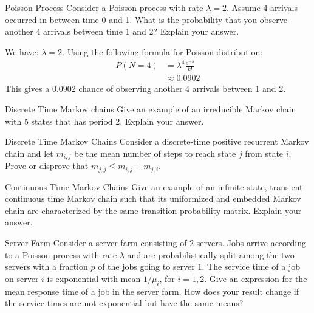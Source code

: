 \begin{problem}{Poisson Process}
 Consider a Poisson process with rate $\lambda =2$. Assume 4 arrivals occurred in between time 0 and 1. What is the probability that you observe another 4 arrivals between time 1 and 2? Explain your answer.
\end{problem}

\begin{solution}
We have: $\lambda =2$. Using the following formula for Poisson distribution:
\begin{align*}
    P(N=4)&= \lambda^4 \frac{e^{-\lambda}}{k!}\\
    & \approx 0.0902
\end{align*}
This gives a $0.0902$ chance of observing another 4 arrivals between 1 and 2.
\end{solution}

\begin{problem}{Discrete Time Markov chains}
Give an example of an irreducible Markov chain
with 5 states that has period $2$. Explain your answer.
\end{problem}

\begin{problem}{Discrete Time Markov Chains}
Consider a discrete-time positive recurrent Markov chain and let $m_{i,j}$ be the mean number of steps to reach state $j$ from state $i$. Prove or disprove that $m_{j,j} \leq m_{i,j} + m_{j,i}$.
\end{problem}

\begin{problem}{Continuous Time Markov Chains}
Give an example of an infinite state, transient continuous time Markov chain such that its uniformized and embedded Markov chain are characterized by the same transition probability matrix. Explain your answer.
\end{problem}

\begin{problem}{Server Farm}
Consider a server farm consisting of $2$ servers. Jobs arrive according to a Poisson process with rate $\lambda$ and are probabilistically split among the two servers with a fraction $p$ of the jobs going to server $1$. The service time of a job on server $i$ is exponential with mean $1/\mu_i$, for $i = 1, 2$. Give an expression for the mean response time of a job in the server farm. How does your result change if the service times are
not exponential but have the same means?
\end{problem}

